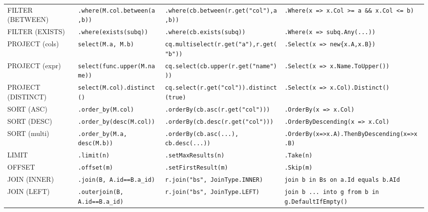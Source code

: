 \begin{landscape}
\begin{longtable}{p{4.5cm}p{5.5cm}p{5.5cm}p{5.5cm}}
FILTER (BETWEEN)
  & \texttt{.where(M.col.between(a,b))}
  & \texttt{.where(cb.between(r.get("col"),a,b))}
  & \texttt{.Where(x => x.Col >= a \&\& x.Col <= b)} \\[4pt]

FILTER (EXISTS)
  & \texttt{.where(exists(subq))}
  & \texttt{.where(cb.exists(subq))}
  & \texttt{.Where(x => subq.Any(...))} \\[4pt]

PROJECT (cols)
  & \texttt{select(M.a, M.b)}
  & \texttt{cq.multiselect(r.get("a"),r.get("b"))}
  & \texttt{.Select(x => new\{x.A,x.B\})} \\[4pt]

PROJECT (expr)
  & \texttt{select(func.upper(M.name))}
  & \texttt{cq.select(cb.upper(r.get("name")))}
  & \texttt{.Select(x => x.Name.ToUpper())} \\[4pt]

PROJECT (DISTINCT)
  & \texttt{select(M.col).distinct()}
  & \texttt{cq.select(r.get("col")).distinct(true)}
  & \texttt{.Select(x => x.Col).Distinct()} \\[4pt]

SORT (ASC)
  & \texttt{.order\_by(M.col)}
  & \texttt{.orderBy(cb.asc(r.get("col")))}
  & \texttt{.OrderBy(x => x.Col)} \\[4pt]

SORT (DESC)
  & \texttt{.order\_by(desc(M.col))}
  & \texttt{.orderBy(cb.desc(r.get("col")))}
  & \texttt{.OrderByDescending(x => x.Col)} \\[4pt]

SORT (multi)
  & \texttt{.order\_by(M.a, desc(M.b))}
  & \texttt{.orderBy(cb.asc(...), cb.desc(...))}
  & \texttt{.OrderBy(x=>x.A).ThenByDescending(x=>x.B)} \\[4pt]

LIMIT
  & \texttt{.limit(n)}
  & \texttt{.setMaxResults(n)}
  & \texttt{.Take(n)} \\[4pt]

OFFSET
  & \texttt{.offset(m)}
  & \texttt{.setFirstResult(m)}
  & \texttt{.Skip(m)} \\[4pt]

JOIN (INNER)
  & \texttt{.join(B, A.id==B.a\_id)}
  & \texttt{r.join("bs", JoinType.INNER)}
  & \texttt{join b in Bs on a.Id equals b.AId} \\[4pt]

JOIN (LEFT)
  & \texttt{.outerjoin(B, A.id==B.a\_id)}
  & \texttt{r.join("bs", JoinType.LEFT)}
  & \texttt{join b ... into g from b in g.DefaultIfEmpty()} \\[4pt]


\end{longtable}
\end{landscape}
